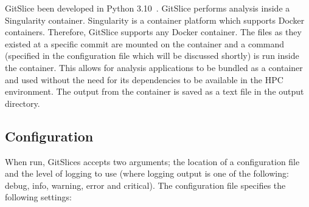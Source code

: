 GitSlice been developed in Python 3.10~\cite{gitlab}.
GitSlice performs analysis inside a Singularity container.
Singularity is a container platform which supports Docker containers.
Therefore, GitSlice supports any Docker container.
The files as they existed at a specific commit are mounted on the container and a command (specified in the configuration file which will be discussed shortly) is run inside the container.
This allows for analysis applications to be bundled as a container and used without the need for its dependencies to be available in the HPC environment.
The output from the container is saved as a text file in the output directory.

\subsection{Configuration}
\label{subsec:configuration}

When run, GitSlices accepts two arguments; the location of a configuration file and the level of logging to use (where logging output is one of the following: debug, info, warning, error and critical).
The configuration file specifies the following settings:

